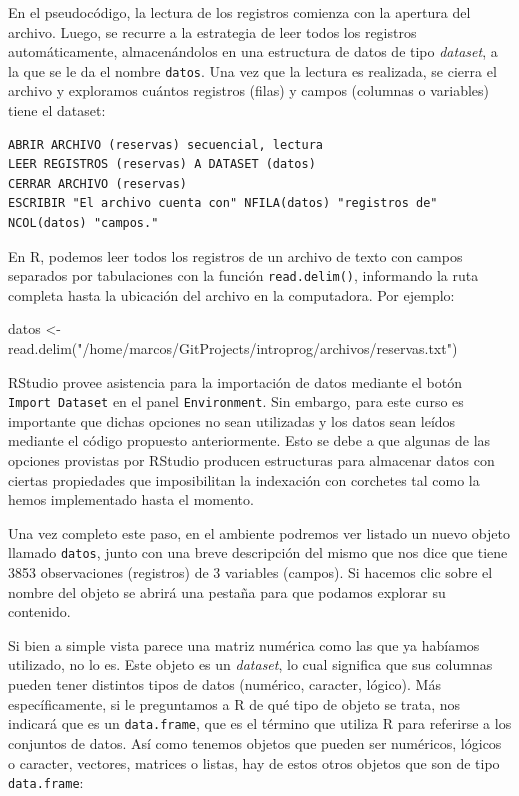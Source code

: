 \documentclass[
]{book}
\newenvironment{Shaded}{\begin{snugshade}}{\end{snugshade}}
\newcommand{\FunctionTok}[1]{\textcolor[rgb]{0.00,0.00,0.00}{#1}}
\newcommand{\NormalTok}[1]{#1}
\newcommand{\OtherTok}[1]{\textcolor[rgb]{0.56,0.35,0.01}{#1}}
\newcommand{\StringTok}[1]{\textcolor[rgb]{0.31,0.60,0.02}{#1}}
\begin{document}
En el pseudocódigo, la lectura de los registros comienza con la apertura del archivo. Luego, se recurre a la estrategia de leer todos los registros automáticamente, almacenándolos en una estructura de datos de tipo \emph{dataset}, a la que se le da el nombre \texttt{datos}. Una vez que la lectura es realizada, se cierra el archivo y exploramos cuántos registros (filas) y campos (columnas o variables) tiene el dataset:

\begin{verbatim}
ABRIR ARCHIVO (reservas) secuencial, lectura
LEER REGISTROS (reservas) A DATASET (datos)
CERRAR ARCHIVO (reservas)
ESCRIBIR "El archivo cuenta con" NFILA(datos) "registros de" NCOL(datos) "campos." 
\end{verbatim}

En R, podemos leer todos los registros de un archivo de texto con campos separados por tabulaciones con la función \texttt{read.delim()}, informando la ruta completa hasta la ubicación del archivo en la computadora. Por ejemplo:

\begin{Shaded}
\begin{Highlighting}[]
\NormalTok{datos }\OtherTok{\textless{}{-}} \FunctionTok{read.delim}\NormalTok{(}\StringTok{"/home/marcos/GitProjects/introprog/archivos/reservas.txt"}\NormalTok{)}
\end{Highlighting}
\end{Shaded}

RStudio provee asistencia para la importación de datos mediante el botón \texttt{Import\ Dataset} en el panel \texttt{Environment}. Sin embargo, para este curso es importante que dichas opciones no sean utilizadas y los datos sean leídos mediante el código propuesto anteriormente. Esto se debe a que algunas de las opciones provistas por RStudio producen estructuras para almacenar datos con ciertas propiedades que imposibilitan la indexación con corchetes tal como la hemos implementado hasta el momento.

Una vez completo este paso, en el ambiente podremos ver listado un nuevo objeto llamado \texttt{datos}, junto con una breve descripción del mismo que nos dice que tiene 3853 observaciones (registros) de 3 variables (campos). Si hacemos clic sobre el nombre del objeto se abrirá una pestaña para que podamos explorar su contenido.

Si bien a simple vista parece una matriz numérica como las que ya habíamos utilizado, no lo es. Este objeto es un \emph{dataset}, lo cual significa que sus columnas pueden tener distintos tipos de datos (numérico, caracter, lógico). Más específicamente, si le preguntamos a R de qué tipo de objeto se trata, nos indicará que es un \texttt{data.frame}, que es el término que utiliza R para referirse a los conjuntos de datos. Así como tenemos objetos que pueden ser numéricos, lógicos o caracter, vectores, matrices o listas, hay de estos otros objetos que son de tipo \texttt{data.frame}:
\end{document}
